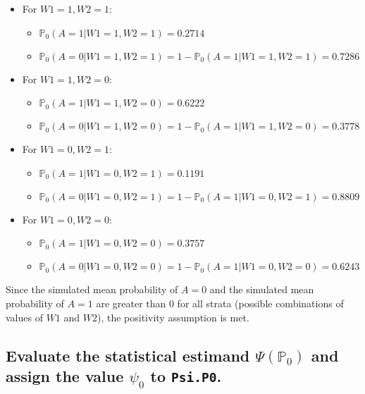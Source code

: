 \documentclass{article}\usepackage[]{graphicx}\usepackage[]{xcolor}
\begin{document}
\begin{itemize}
  \item For $W1=1,W2=1$:
  \begin{itemize}
    \item $\mathbb{P}_0(A=1|W1=1,W2=1)=0.2714$
    \item $\mathbb{P}_0(A=0|W1=1,W2=1)=1-\mathbb{P}_0(A=1|W1=1,W2=1)=0.7286$
  \end{itemize}
  \item For $W1=1,W2=0$:
  \begin{itemize}
    \item $\mathbb{P}_0(A=1|W1=1,W2=0)=0.6222$
    \item $\mathbb{P}_0(A=0|W1=1,W2=0)=1-\mathbb{P}_0(A=1|W1=1,W2=0)=0.3778$  
  \end{itemize}
  \item For $W1=0,W2=1$:
  \begin{itemize}
    \item $\mathbb{P}_0(A=1|W1=0,W2=1)=0.1191$
    \item $\mathbb{P}_0(A=0|W1=0,W2=1)=1-\mathbb{P}_0(A=1|W1=0,W2=1)=0.8809$  
  \end{itemize}
  \item For $W1=0,W2=0$:
  \begin{itemize}
    \item $\mathbb{P}_0(A=1|W1=0,W2=0)=0.3757$
    \item $\mathbb{P}_0(A=0|W1=0,W2=0)=1-\mathbb{P}_0(A=1|W1=0,W2=0)=0.6243$
  \end{itemize}
\end{itemize}

Since the simulated mean probability of $A=0$ and the simulated mean probability of $A=1$ are greater than 0 for all strata (possible combinations of values of $W1$ and $W2$), the positivity assumption is met.

  \subsection{Evaluate the statistical estimand $\Psi(\mathbb{P}_0)$ and assign the value $\psi_0$ to \texttt{Psi.P0}.}
\end{document}
